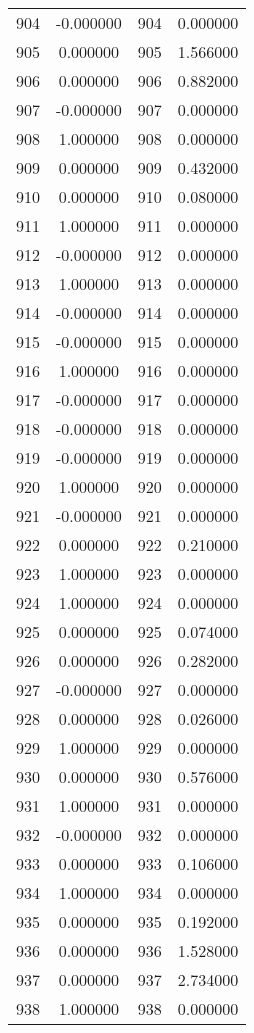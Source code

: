 \documentclass[12pt]{article}
\begin{document}
\begin{longtable}{@{}cccc@{}}
904 & -0.000000 & 904 & 0.000000 \\
905 & 0.000000 & 905 & 1.566000 \\
906 & 0.000000 & 906 & 0.882000 \\
907 & -0.000000 & 907 & 0.000000 \\
908 & 1.000000 & 908 & 0.000000 \\
909 & 0.000000 & 909 & 0.432000 \\
910 & 0.000000 & 910 & 0.080000 \\
911 & 1.000000 & 911 & 0.000000 \\
912 & -0.000000 & 912 & 0.000000 \\
913 & 1.000000 & 913 & 0.000000 \\
914 & -0.000000 & 914 & 0.000000 \\
915 & -0.000000 & 915 & 0.000000 \\
916 & 1.000000 & 916 & 0.000000 \\
917 & -0.000000 & 917 & 0.000000 \\
918 & -0.000000 & 918 & 0.000000 \\
919 & -0.000000 & 919 & 0.000000 \\
920 & 1.000000 & 920 & 0.000000 \\
921 & -0.000000 & 921 & 0.000000 \\
922 & 0.000000 & 922 & 0.210000 \\
923 & 1.000000 & 923 & 0.000000 \\
924 & 1.000000 & 924 & 0.000000 \\
925 & 0.000000 & 925 & 0.074000 \\
926 & 0.000000 & 926 & 0.282000 \\
927 & -0.000000 & 927 & 0.000000 \\
928 & 0.000000 & 928 & 0.026000 \\
929 & 1.000000 & 929 & 0.000000 \\
930 & 0.000000 & 930 & 0.576000 \\
931 & 1.000000 & 931 & 0.000000 \\
932 & -0.000000 & 932 & 0.000000 \\
933 & 0.000000 & 933 & 0.106000 \\
934 & 1.000000 & 934 & 0.000000 \\
935 & 0.000000 & 935 & 0.192000 \\
936 & 0.000000 & 936 & 1.528000 \\
937 & 0.000000 & 937 & 2.734000 \\
938 & 1.000000 & 938 & 0.000000 \\

\end{longtable}
\end{document}
